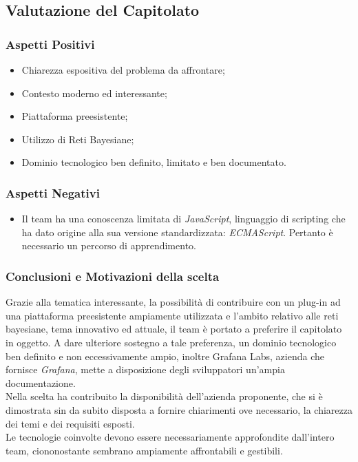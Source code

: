 \subsection{Valutazione del Capitolato}
\subsubsection{Aspetti Positivi}
\begin{itemize}
	\item Chiarezza espositiva del problema da affrontare;
	\item Contesto moderno ed interessante;
	\item Piattaforma preesistente;
	\item Utilizzo di Reti Bayesiane;
	\item Dominio tecnologico ben definito, limitato e ben documentato.
\end{itemize}

\subsubsection{Aspetti Negativi}
\begin{itemize}
	\item Il team ha una conoscenza limitata di \textit{JavaScript}\glossario, linguaggio di scripting che ha dato origine alla sua versione standardizzata: \textit{ECMAScript}. Pertanto è necessario un percorso di apprendimento.
\end{itemize}

\subsubsection{Conclusioni e Motivazioni della scelta}
Grazie alla tematica interessante, la possibilità di contribuire con un plug-in ad una piattaforma preesistente ampiamente utilizzata e l'ambito relativo alle reti bayesiane, tema innovativo ed attuale, il team è portato a preferire il capitolato in oggetto. A dare ulteriore sostegno a tale preferenza, un dominio tecnologico ben definito e non eccessivamente ampio, inoltre {Grafana Labs}, azienda che fornisce \textit{Grafana}, mette a disposizione degli sviluppatori un'ampia documentazione.\\
 Nella scelta ha contribuito la disponibilità dell'azienda proponente, che si è dimostrata sin da subito disposta a fornire chiarimenti ove necessario, la chiarezza dei temi e dei requisiti esposti.\\
Le tecnologie coinvolte devono essere necessariamente approfondite dall'intero team, ciononostante sembrano  ampiamente affrontabili e gestibili.
